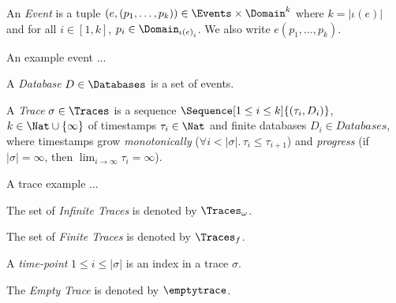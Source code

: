 \begin{definition}
    \label{def:event}
    An \emph{Event} is a tuple
    $\left(e, \left(p_1, \dots, p_k \right) \right)
    \in \Events \times \Domain^{k}$
    where $k=\left|\iota\left(e\right)\right|$ and
    for all $i \in \left[1,k\right]$, $p_i \in \Domain_{\iota\left(e\right)_i}$.
    We also write $e\left(p_1,\dots,p_k\right)$.
\end{definition}
\begin{example}
    \label{ex:event}
    An example event ...
\end{example}

\begin{definition}
    \label{def:database}
    A \emph{Database} $D \in \Databases$ is a set of events.
\end{definition}

\begin{definition}
    \label{def:trace}
    A \emph{Trace} $\sigma \in \Traces$ is a sequence
    $\Sequence[1 \leq i \leq k]{(\tau_i, D_i)}$, $k \in \Nat \cup \lbrace \infty \rbrace$
    of timestamps $\tau_i \in \Nat$ and finite databases $D_i \in Databases$,
    where timestamps grow \emph{monotonically}
    ($\forall i < |\sigma|.\,\tau_i \leq \tau_{i+1}$)
    and \emph{progress}
    (if $|\sigma| = \infty$, then $\lim_{i\to\infty} \tau_i = \infty$).
\end{definition}
\begin{example}
    \label{ex:trace}
    A trace example ...
\end{example}

\begin{definition}
    \label{def:infinite-trace}
    The set of \emph{Infinite Traces} is denoted by $\Traces_\omega$.
\end{definition}

\begin{definition}
    \label{def:finite-trace}
    The set of \emph{Finite Traces} is denoted by $\Traces_f$.
\end{definition}

\begin{definition}
    \label{def:time-point}
    A \emph{time-point} $1 \leq i \leq |\sigma|$ is an index in a trace $\sigma$.
\end{definition}

\begin{definition}
    \label{def:empty-trace}
    The \emph{Empty Trace} is denoted by $\emptytrace$.
\end{definition}

